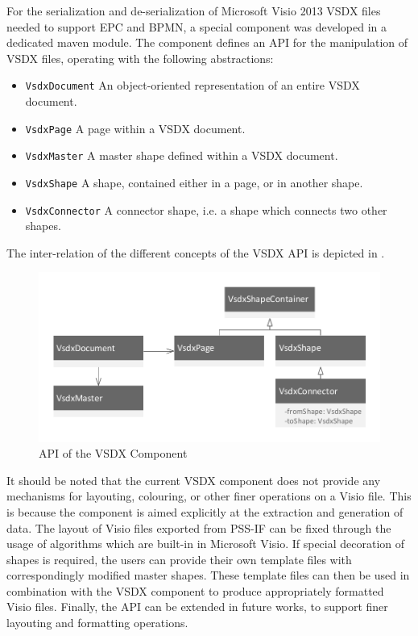 For the serialization and de-serialization of Microsoft Visio 2013 VSDX files needed to support EPC and BPMN, a special component was developed in a dedicated maven module. The component defines an API for the manipulation of VSDX files, operating with the following abstractions:

\begin{itemize}
\item \texttt{VsdxDocument} An object-oriented representation of an entire VSDX document.
\item \texttt{VsdxPage} A page within a VSDX document.
\item \texttt{VsdxMaster} A master shape defined within a VSDX document.
\item \texttt{VsdxShape} A shape, contained either in a page, or in another shape.
\item \texttt{VsdxConnector} A connector shape, i.e. a shape which connects two other shapes.
\end{itemize}

The inter-relation of the different concepts of the VSDX API is depicted in .

\begin{figure}[h]
\centering
\includegraphics[scale=0.75]{figures/visio.pdf}
\caption{API of the VSDX Component}
\label{fig:vsdxapi}
\end{figure}

It should be noted that the current VSDX component does not provide any mechanisms for layouting, colouring, or other finer operations on a Visio file. This is because the component is aimed explicitly at the extraction and generation of data. The layout of Visio files exported from PSS-IF can be fixed through the usage of algorithms which are built-in in Microsoft Visio. If special decoration of shapes is required, the users can provide their own template files with correspondingly modified master shapes. These template files can then be used in combination with the VSDX component to produce appropriately formatted Visio files. Finally, the API can be extended in future works, to support finer layouting and formatting operations.

